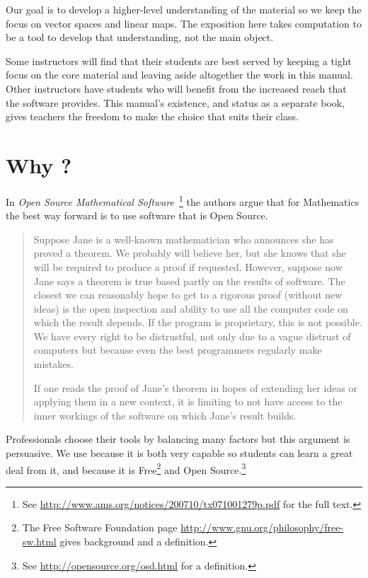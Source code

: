 Our goal is to 
develop a higher-level understanding of the material so we 
keep the focus on vector spaces and linear maps.
The exposition here takes computation to be
a tool to develop that understanding, not the main object.

Some instructors will find 
that their students are best served by
keeping a tight focus on the
core material and leaving aside altogether 
the work in this manual. 
Other instructors
have students who will benefit from the increased reach that the software
provides.
This manual's existence, and status as a separate book, gives teachers the 
freedom to make the choice that suits their class.


\section{Why \Sage?}
In 
\textit{Open Source Mathematical Software\,} \citep{JoynerStein07}\footnote{See 
\protect\url{http://www.ams.org/notices/200710/tx071001279p.pdf} for the 
full text.}
the authors argue that for Mathematics the best way forward
is to use software that is Open Source.

\begin{quotation}\small
Suppose Jane is a well-known mathematician who announces
she has proved a theorem. We probably will believe
her, but she knows that she will be required to produce
a proof if requested. However, suppose now Jane says a
theorem is true based partly on the results of software. The
closest we can reasonably hope to get to a rigorous proof
(without new ideas) is the open inspection and ability to use
all the computer code on which the result depends. If the
program is proprietary, this is not possible. We have every
right to be distrustful, not only due to a vague distrust of
computers but because even the best programmers regularly
make mistakes.

If one reads the proof of Jane’s theorem in hopes of
extending her ideas or applying them in a new context, it
is limiting to not have access to the inner workings of the
software on which Jane’s result builds.
\end{quotation}  
Professionals choose their tools by balancing many factors but
this argument is persuasive.
We use \Sage{} because it is both very capable 
so students can 
learn a great deal from it,
and because it is 
Free\footnote{The Free Software Foundation page 
\protect\url{http://www.gnu.org/philosophy/free-sw.html} 
gives background and a definition.} 
and Open Source.\footnote{See \protect\url{http://opensource.org/osd.html} 
for a definition.} 



